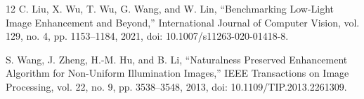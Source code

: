 \documentclass[conference]{IEEEtran}
\begin{document}
\begin{thebibliography}{12}
 C. Liu, X. Wu, T. Wu, G. Wang, and W. Lin, ``Benchmarking Low-Light Image Enhancement and Beyond,'' International Journal of Computer Vision, vol. 129, no. 4, pp. 1153--1184, 2021, doi: 10.1007/s11263-020-01418-8.

 S. Wang, J. Zheng, H.-M. Hu, and B. Li, ``Naturalness Preserved Enhancement Algorithm for Non-Uniform Illumination Images,'' IEEE Transactions on Image Processing, vol. 22, no. 9, pp. 3538--3548, 2013, doi: 10.1109/TIP.2013.2261309.

\end{thebibliography}
\end{document}
